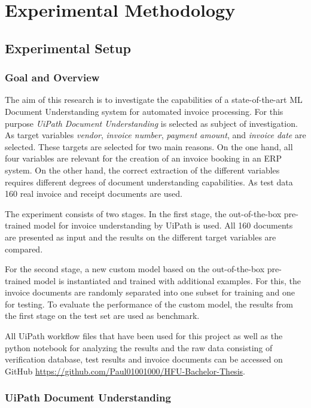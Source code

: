 \chapter{Experimental Methodology}

\section{Experimental Setup}
\subsection{Goal and Overview}
The aim of this research is to investigate the capabilities of a state-of-the-art \acl{ML} Document Understanding system for automated invoice processing. For this purpose \textit{UiPath Document Understanding} is selected as subject of investigation. As target variables \textit{vendor}, \textit{invoice number}, \textit{payment amount}, and \textit{invoice date} are selected. These targets are selected for two main reasons. On the one hand, all four variables are relevant for the creation of an invoice booking in an ERP system. On the other hand, the correct extraction of the different variables requires different degrees of document understanding capabilities. As test data 160 real invoice and receipt documents are used.

The experiment consists of two stages. In the first stage, the out-of-the-box pre-trained model for invoice understanding by UiPath is used. All 160 documents are presented as input and the results on the different target variables are compared. 

For the second stage, a new custom model based on the out-of-the-box pre-trained model is instantiated and trained with additional examples. For this, the invoice documents are randomly separated into one subset for training and one for testing. To evaluate the performance of the custom model, the results from the first stage on the test set are used as benchmark. 

All UiPath workflow files that have been used for this project as well as the python notebook for analyzing the results and the raw data consisting of verification database, test results and invoice documents can be accessed on GitHub \url{https://github.com/Paul01001000/HFU-Bachelor-Thesis}.

\subsection{UiPath Document Understanding}

